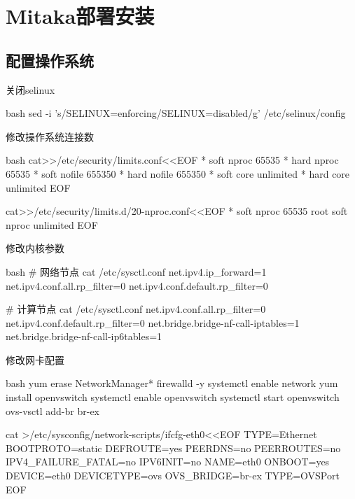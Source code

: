 \chapter{Mitaka部署安装}

\section{配置操作系统}
\label{section:system_configuration}
\begin{outline}[enumerate]

\1 关闭selinux
\begin{code-in-enumerate}{bash}
sed -i 's/SELINUX=enforcing/SELINUX=disabled/g' /etc/selinux/config
\end{code-in-enumerate}

\1 修改操作系统连接数
\begin{code-in-enumerate}{bash}
cat>>/etc/security/limits.conf<<EOF
*               soft    nproc           65535
*               hard    nproc           65535
*               soft    nofile          655350
*               hard    nofile          655350
*               soft    core            unlimited
*               hard    core            unlimited
EOF

cat>>/etc/security/limits.d/20-nproc.conf<<EOF
*          soft    nproc     65535
root       soft    nproc     unlimited
EOF
\end{code-in-enumerate}

\1 修改内核参数
\begin{code-in-enumerate}{bash}
# 网络节点
cat /etc/sysctl.conf
net.ipv4.ip_forward=1
net.ipv4.conf.all.rp_filter=0
net.ipv4.conf.default.rp_filter=0

# 计算节点
cat /etc/sysctl.conf
net.ipv4.conf.all.rp_filter=0
net.ipv4.conf.default.rp_filter=0
net.bridge.bridge-nf-call-iptables=1
net.bridge.bridge-nf-call-ip6tables=1
\end{code-in-enumerate}

\1 修改网卡配置
\begin{code-in-enumerate}{bash}
yum erase NetworkManager* firewalld -y
systemctl enable network
yum install openvswitch
systemctl enable openvswitch
systemctl start openvswitch
ovs-vsctl add-br br-ex

cat >/etc/sysconfig/network-scripts/ifcfg-eth0<<EOF
TYPE=Ethernet
BOOTPROTO=static
DEFROUTE=yes
PEERDNS=no
PEERROUTES=no
IPV4_FAILURE_FATAL=no
IPV6INIT=no
NAME=eth0
ONBOOT=yes
DEVICE=eth0
DEVICETYPE=ovs
OVS_BRIDGE=br-ex
TYPE=OVSPort
EOF


\end{code-in-enumerate}
\end{outline}
